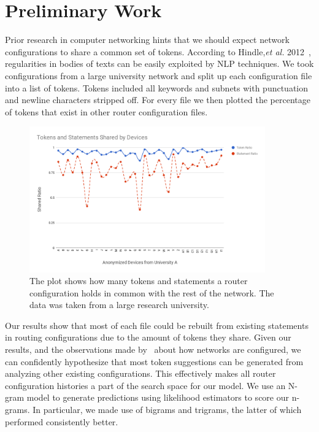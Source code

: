 \section{Preliminary Work}

Prior research in computer networking hints that we should expect network configurations to share a common set of tokens. According to Hindle,\textit{et al.} 2012~\cite{naturalness}, regularities in bodies of texts can be easily exploited by NLP techniques. We took configurations from a large university network and split up each configuration file into a list of tokens. Tokens included all keywords and subnets with punctuation and newline characters stripped off. For every file we then plotted the percentage of tokens that exist in other router 
configuration files.

\begin{figure}[H]
	\centering
	\includegraphics[width=4in]{chart.png}
	\caption{The plot shows how many tokens and statements a router configuration holds in common with the rest of the network. The data was taken from a large research university.}
\end{figure}

Our results show that most of each file could be rebuilt from existing statements in routing configurations due to the amount of tokens they share. Given our results, and the observations made by~\cite{complexity} about how networks are configured, we can confidently hypothesize that most token suggestions can be generated from analyzing other existing configurations. This effectively makes all router configuration histories a part of the search space for our model. We use an N-gram model to generate predictions using likelihood estimators to score our n-grams. In particular, we made use of bigrams and trigrams, the latter of which performed consistently better.


